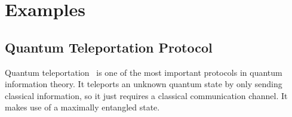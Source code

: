 \documentclass[a4paper,runningheads]{llncs}
\def\leaveout#1{}
\begin{document}

\section{Examples}
\label{sec:examples}
\subsection{Quantum Teleportation Protocol}
Quantum teleportation~\cite{BB93} is one of the most important protocols in quantum information theory. It teleports an unknown quantum state by only sending classical information, so it just requires a classical communication channel. It makes use of a maximally entangled state. 
\end{document}
